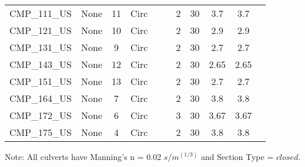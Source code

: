 \begin{table}[]
\begin{tabular}{@{}lcccccccccc@{}}
CMP\_111\_US  & None       & 11       & Circ &        &       & 2        & 30     & 3.7       & 3.7        \\
CMP\_121\_US  & None       & 10       & Circ &        &       & 2        & 30     & 2.9       & 2.9        \\
CMP\_131\_US  & None       & 9        & Circ &        &       & 2        & 30     & 2.7       & 2.7        \\
CMP\_143\_US  & None       & 12       & Circ &        &       & 2        & 30     & 2.65      & 2.65       \\
CMP\_151\_US  & None       & 13       & Circ &        &       & 2        & 30     & 2.7       & 2.7        \\
CMP\_164\_US  & None       & 7        & Circ &        &       & 2        & 30     & 3.8       & 3.8        \\
CMP\_172\_US  & None       & 6        & Circ &        &       & 3        & 30     & 3.67      & 3.67       \\
CMP\_175\_US  & None       & 4        & Circ &        &       & 2        & 30     & 3.8       & 3.8        \\
\bottomrule
\end{tabular}
Note: All culverts have Manning's n = 0.02 $s/m^{(1/3)}$ and Section Type = $closed$.
\end{table}
\clearpage



